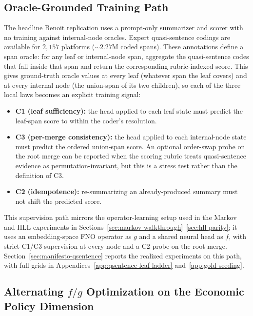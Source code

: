 \subsection{Oracle-Grounded Training Path}

The headline Benoit replication uses a prompt-only summarizer and
scorer with no training against internal-node oracles. Expert
quasi-sentence codings are available for $2{,}157$ platforms
($\sim\!2.27$M coded spans). These annotations define a span oracle:
for any leaf or internal-node span, aggregate the quasi-sentence codes
that fall inside that span and return the corresponding rubric-indexed
score. This gives ground-truth oracle values at every leaf (whatever
span the leaf covers) and at every internal node (the union-span of its
two children), so each of the three local laws becomes an explicit
training signal:

\begin{itemize}[leftmargin=1.5em]
    \item \textbf{C1 (leaf sufficiency):} the head applied to each
          leaf state must predict the leaf-span score to within the
          coder's resolution.
    \item \textbf{C3 (per-merge consistency):} the head applied to each
          internal-node state must predict the ordered union-span score.
          An optional order-swap probe on the root merge can be reported
          when the scoring rubric treats quasi-sentence evidence as
          permutation-invariant, but this is a stress test rather than
          the definition of C3.
    \item \textbf{C2 (idempotence):} re-summarizing an already-produced
          summary must not shift the predicted score.
\end{itemize}

This supervision path mirrors the operator-learning setup used in the
Markov and HLL experiments in
Sections~\ref{sec:markov-walkthrough}--\ref{sec:hll-parity}; it uses
an embedding-space FNO operator as $g$ and a shared neural head as
$f$, with strict C1/C3 supervision at every node and a C2 probe on
the root merge. Section~\ref{sec:manifesto-qsentence} reports the
realized experiments on this path, with full grids in
Appendices~\ref{app:qsentence-leaf-ladder}
and~\ref{app:gold-seeding}.

\subsection[Alternating f/g Optimization on the Economic Policy Dimension]{Alternating $f/g$ Optimization on the Economic Policy
Dimension}\label{app:rile-fg-ladder}

